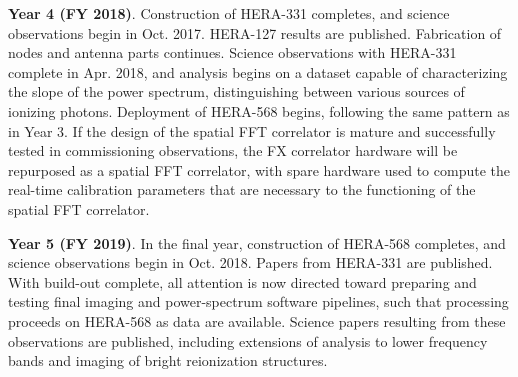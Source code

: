 \documentclass[preprint]{aastex}
\begin{document}
{\bf Year 4 (FY 2018)}.  Construction of HERA-331 completes, and
science observations begin in Oct. 2017.   HERA-127 results are published.
Fabrication of nodes and antenna parts continues.  Science observations with
HERA-331 complete in Apr. 2018, and analysis begins on a dataset capable of
characterizing the slope of the power spectrum, distinguishing between various
sources of ionizing photons.  Deployment of HERA-568 begins, following the same
pattern as in Year 3.  If the design of the spatial FFT correlator is mature
and successfully tested in commissioning observations, the FX correlator
hardware will be repurposed as a spatial FFT correlator, with spare hardware
used to compute the real-time calibration parameters that are necessary to the
functioning of the spatial FFT correlator.

{\bf Year 5 (FY 2019)}.  In the final year, construction of HERA-568
completes, and science observations begin in Oct. 2018.  Papers from HERA-331
are published.  With build-out complete, all attention is now directed toward
preparing and testing final imaging and power-spectrum software pipelines, such
that processing proceeds on HERA-568 as data are available.  Science papers
resulting from these observations are published, including extensions of
analysis to lower frequency bands and imaging of bright reionization
structures.


\end{document}
